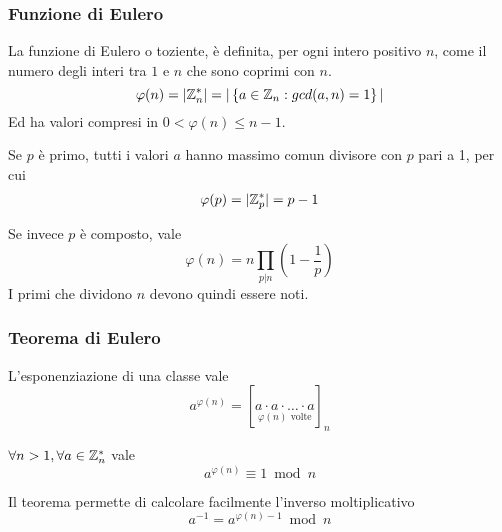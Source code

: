 \subsubsection{Funzione di Eulero}

\begin{definition}
    \label{def:euler_function}
    La funzione di Eulero o toziente, è definita, per ogni intero positivo $n$, come il numero degli interi tra $1$ e $n$ che sono coprimi con $n$. 
    \begin{equation*}
        \varphi (n)
        =
        | \mathbb{Z}_{n}^{*} |
        = |
        \left\{ 
            a \in \mathbb{Z}_{n} : gcd(a, n) = 1
        \right\}
        |
    \end{equation*}
    Ed ha valori compresi in $
    0 < \varphi (n) \leq n -1
    $.
\end{definition}

Se $p$ è primo, tutti i valori $a$ hanno massimo comun divisore con $p$ pari a 1, per cui
\begin{equation*}
    \varphi (p)
    =
    | \mathbb{Z}_{p}^{*} |
    = p - 1
\end{equation*}

Se invece $p$ è composto, vale
\begin{equation*}
    \varphi (n) 
    =
    n
    \prod_{p|n} 
    \left( 
        1 - \frac{1}{p}
    \right)
\end{equation*}
I primi che dividono $n$ devono quindi essere noti.


\subsubsection{Teorema di Eulero}


L'esponenziazione di una classe vale 
\begin{equation*}
    a^{\varphi (n)}
    =
    [
        \underset{
            \varphi (n) \text{ volte}
        }{
            a \cdot a \cdot \ldots \cdot a
        }
    ]_n
\end{equation*}

\begin{theorem}
    \label{teo:eulero}
    $
    \forall n > 1,
    \forall a \in \mathbb{Z}_{n}^{*} 
    $
    vale
    \begin{equation*}
        a^{\varphi (n)}
        \equiv 1 \bmod n
    \end{equation*}
\end{theorem}
Il teorema permette di calcolare facilmente l'inverso moltiplicativo
\begin{equation*}
    a^{-1}
    =
    a^{\varphi (n) - 1} \bmod n
\end{equation*}

